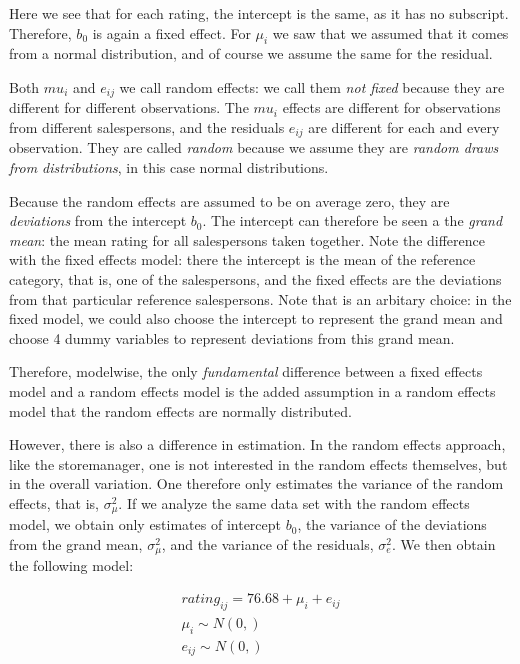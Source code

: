 Here we see that for each rating, the intercept is the same, as it has no subscript. Therefore, $b_0$ is again a fixed effect. For $\mu_i$ we saw that we assumed that it comes from a normal distribution, and of course we assume the same for the residual.

Both $mu_i$ and $e_{ij}$ we call random effects: we call them \textit{not fixed} because they are different for different observations. The $mu_i$ effects are different for observations from different salespersons, and the residuals $e_{ij}$ are different for each and every observation. They are called \textit{random} because we assume they are \textit{random draws from distributions}, in this case normal distributions.

Because the random effects are assumed to be on average zero, they are \textit{deviations} from the intercept $b_0$. The intercept can therefore be seen a the \textit{grand mean}: the mean rating for all salespersons taken together. Note the difference with the fixed effects model: there the intercept is the mean of the reference category, that is, one of the salespersons, and the fixed effects are the deviations from that particular reference salespersons. Note that is an arbitary choice: in the fixed model, we could also choose the intercept to represent the grand mean and choose 4 dummy variables to represent deviations from this grand mean.

Therefore, modelwise, the only \textit{fundamental} difference between a fixed effects model and a random effects model is the added assumption in a random effects model that the random effects are normally distributed.

However, there is also a difference in estimation. In the random effects approach, like the storemanager, one is not interested in the random effects themselves, but in the overall variation. One therefore only estimates the variance of the random effects, that is, $\sigma^2_\mu$. If we analyze the same data set with the random effects model, we obtain only estimates of intercept $b_0$, the variance of the deviations from the grand mean, $\sigma^2_\mu$, and the variance of the residuals, $\sigma^2_e$. We then obtain the following model:


\begin{eqnarray}
rating_{ij} = 76.68 + \mu_i + e_{ij} \\
\mu_i \sim N(0, ) \\
e_{ij} \sim N(0, )
\end{eqnarray}

